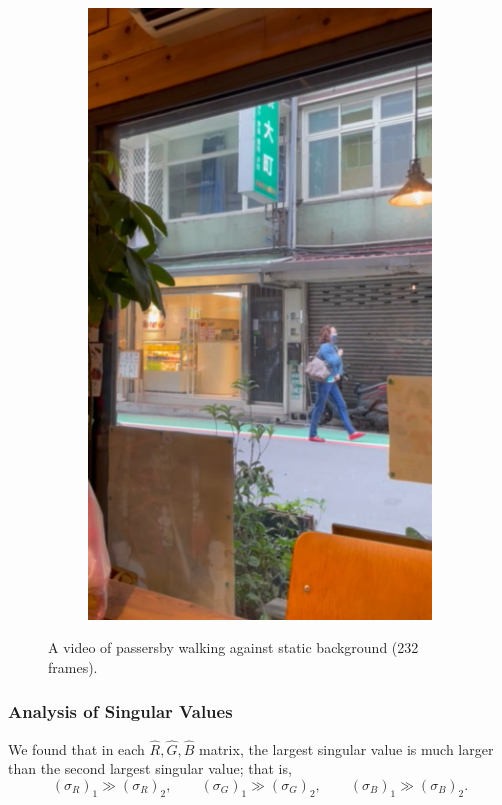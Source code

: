 \documentclass[12pt]{article}
\theoremstyle{definition}
\begin{document}
\begin{figure}[ht]
\begin{subfigure}[b]{0.3\textwidth}
         \includegraphics[width=\textwidth]{ch3_figures/video_3.png}
         \label{fig:video_3}
     \end{subfigure}
     \caption{A video of passersby walking against static background (232 frames).}
     \label{fig:video}
\end{figure}

\subsubsection{Analysis of Singular Values}
We found that in each $\hat{R},\hat{G},\hat{B}$ matrix, the largest singular value is much larger than the second largest singular value; that is,
\[ (\sigma_R)_1 \gg (\sigma_R)_2, \qquad
(\sigma_G)_1 \gg (\sigma_G)_2, \qquad
(\sigma_B)_1 \gg (\sigma_B)_2.
\]
\end{document}
